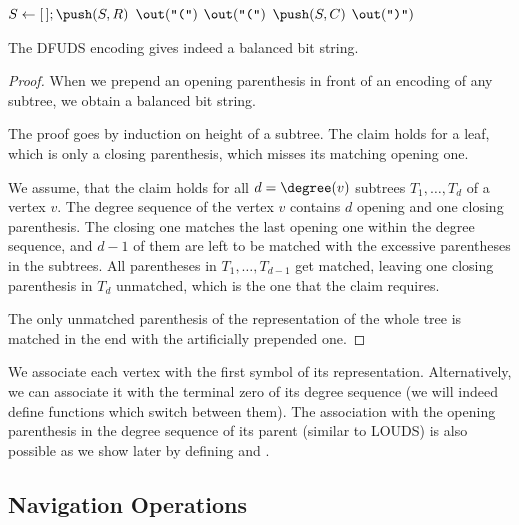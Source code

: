 \begin{algorithm}
\begin{algorithmic}
	\State $S \gets [\,]; \push(S, R)$ 
	\State $\out(\openingParen)$
			\State $\out(\openingParen)$
			\State $\push(S, C)$
		\EndFor
		\State $\out(\closingParen)$
	\EndWhile
\EndFunction
\end{algorithmic}
\end{algorithm}

\begin{lemma}\label{l:dfuds}
	The DFUDS encoding gives indeed a balanced bit string.
\end{lemma}
\begin{proof}
	When we prepend an opening parenthesis in front of an encoding of any subtree, we obtain a balanced bit string.
	
	The proof goes by induction on height of a subtree.
	The claim holds for a leaf, which is only a closing parenthesis, which misses its matching opening one.
	
	We assume, that the claim holds for all $d = \degree(v)$ subtrees $T_1, \ldots, T_d$ of a vertex $v$.
	The degree sequence of the vertex $v$ contains $d$ opening and one closing parenthesis.
	The closing one matches the last opening one within the degree sequence, and $d - 1$ of them are left to be matched with the excessive parentheses in the subtrees.
	All parentheses in $T_1, \ldots, T_{d-1}$ get matched, leaving one closing parenthesis in $T_d$ unmatched, which is the one that the claim requires.
	
	The only unmatched parenthesis of the representation of the whole tree is matched in the end with the artificially prepended one.
\end{proof}

We associate each vertex with the first symbol of its representation.
Alternatively, we can associate it with the terminal zero of its degree sequence (we will indeed define functions which switch between them).
The association with the opening parenthesis in the degree sequence of its parent (similar to LOUDS) is also possible as we show later by defining \dfudsRank{} and \dfudsSelect{}.

\subsection{Navigation Operations}

